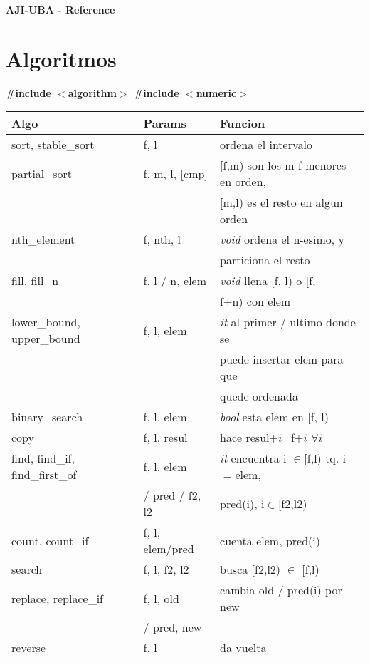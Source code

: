 \documentclass[10pt,landscape,twocolumn,a4paper,notitlepage]{article}
\def\nbtitle#1{\begin{Large}\begin{center}\textbf{#1}\end{center}\end{Large}}
\begin{document}
\tableofcontents\newpage

\nbtitle{AJI-UBA - Reference}
\section{Algoritmos}
\textbf{\#include $<$algorithm$>$ \#include $<$numeric$>$ \\}
\begin{tabular}{|l|l|l|} \hline
\textbf{Algo} & \textbf{Params} &  \textbf{Funcion} \\  \hline
sort, stable\_sort & f, l &  ordena el intervalo \\  \hline
partial\_sort & f, m, l, [cmp] & [f,m) son los m-f menores en orden, \\ && [m,l) es el resto en algun orden \\ \hline
nth\_element & f, nth, l & \textit{void} ordena el n-esimo, y \\ && particiona el resto \\  \hline
fill, fill\_n & f, l / n, elem & \textit{void} llena [f, l) o [f, \\ && f+n) con elem \\  \hline
lower\_bound, upper\_bound & f, l, elem & \textit{it} al primer / ultimo donde se \\ && puede insertar elem para que\\ && quede ordenada \\  \hline
binary\_search & f, l, elem & \textit{bool} esta elem en [f, l) \\  \hline
copy & f, l, resul & hace resul+$i$=f+$i$ $\forall i$ \\  \hline
find, find\_if, find\_first\_of & f, l, elem & \textit{it} encuentra i $\in$[f,l) tq. i$=$elem, \\ & / pred / f2, l2 & pred(i), i$\in$[f2,l2) \\ \hline
count, count\_if & f, l, elem/pred & cuenta elem, pred(i) \\ \hline
search & f, l, f2, l2 & busca [f2,l2) $\in$ [f,l) \\ \hline
replace, replace\_if & f, l, old & cambia old / pred(i) por new \\ & / pred, new & \\ \hline
reverse & f, l & da vuelta \\ \hline

\end{tabular}
\end{document}
